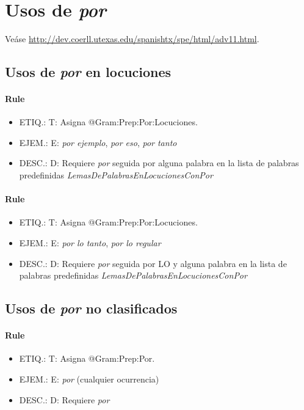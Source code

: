 \documentclass[11pt]{report}
\begin{document}
\section{Usos de \emph{por}}
Veáse \url{http://dev.coerll.utexas.edu/spanishtx/spe/html/adv11.html}.

\subsection{Usos de \emph{por} en locuciones}
\paragraph*{Rule}
\begin{itemize}
\item ETIQ.:  T: Asigna @Gram:Prep:Por:Locuciones.
\item EJEM.:  E: \emph{por ejemplo}, \emph{por eso}, \emph{por tanto}
\item DESC.:  D: Requiere \emph{por} seguida por alguna palabra en la lista de palabras predefinidas \emph{LemasDePalabrasEnLocucionesConPor}
\end{itemize}

\paragraph*{Rule}
\begin{itemize}
\item ETIQ.:  T: Asigna @Gram:Prep:Por:Locuciones.
\item EJEM.:  E: \emph{por lo tanto}, \emph{por lo regular}
\item DESC.:  D: Requiere \emph{por} seguida por LO y alguna palabra en la lista de palabras predefinidas \emph{LemasDePalabrasEnLocucionesConPor}
\end{itemize}

\subsection{Usos de \emph{por} no clasificados}
\paragraph*{Rule}
\begin{itemize}
\item ETIQ.:  T: Asigna @Gram:Prep:Por.
\item EJEM.:  E: \emph{por} (cualquier ocurrencia)
\item DESC.:  D: Requiere \emph{por}
\end{itemize}
\end{document}
